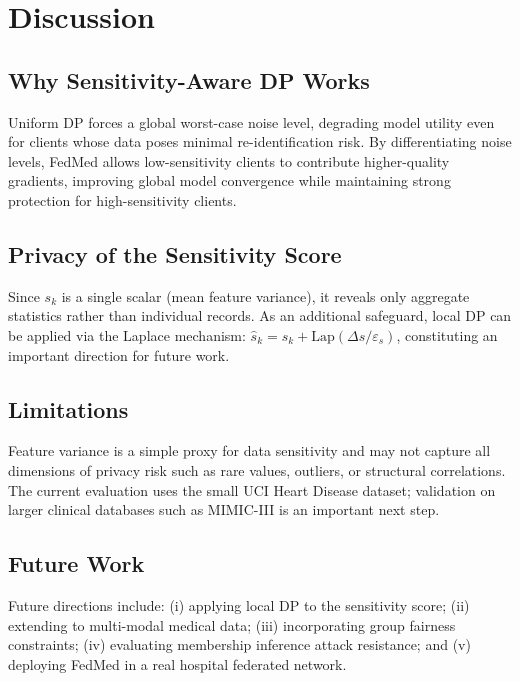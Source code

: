 \documentclass[journal]{IEEEtran}
\begin{document}
\section{Discussion}
\label{sec:discussion}

\subsection{Why Sensitivity-Aware DP Works}
Uniform DP forces a global worst-case noise level, degrading model utility
even for clients whose data poses minimal re-identification risk. By
differentiating noise levels, FedMed allows low-sensitivity clients to
contribute higher-quality gradients, improving global model convergence while
maintaining strong protection for high-sensitivity clients.

\subsection{Privacy of the Sensitivity Score}
Since $s_k$ is a single scalar (mean feature variance), it reveals only
aggregate statistics rather than individual records. As an additional
safeguard, local DP can be applied via the Laplace mechanism:
$\hat{s}_k = s_k + \mathrm{Lap}(\Delta s/\varepsilon_s)$, constituting
an important direction for future work.

\subsection{Limitations}
Feature variance is a simple proxy for data sensitivity and may not capture
all dimensions of privacy risk such as rare values, outliers, or structural
correlations. The current evaluation uses the small UCI Heart Disease dataset;
validation on larger clinical databases such as MIMIC-III \cite{johnson2016}
is an important next step.

\subsection{Future Work}
Future directions include: (i) applying local DP to the sensitivity score;
(ii) extending to multi-modal medical data; (iii) incorporating group fairness
constraints; (iv) evaluating membership inference attack resistance; and
(v) deploying FedMed in a real hospital federated network.
\end{document}

